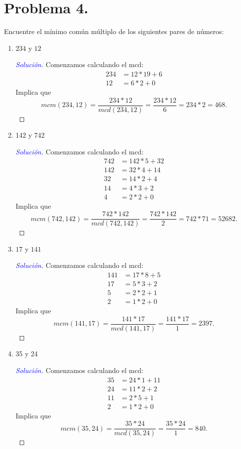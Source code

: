 \documentclass[a4paper,12pt]{article}
\newenvironment{solution}
  {\renewcommand\qedsymbol{$\square$}\begin{proof}[\textcolor{blue}{Solución}]}
  {\end{proof}}
\begin{document}
\section{Problema 4.} Encuentre el mínimo común múltiplo de los siguientes pares de números:
\begin{enumerate}[label=\alph*.]
	\item $234$ y $12$
	\begin{solution}
		Comenzamos calculando el mcd:
		\begin{align*}
			 234 &= 12*19 + 6\\
			12    &= 6*2 + 0
		\end{align*}
	Implica que 
	$$mcm(234,12)=\frac{234*12}{mcd(234,12)}=\frac{234*12}{6}=234*2=468.$$
	\end{solution}
	\item 142 y 742
	\begin{solution}
			Comenzamos calculando el mcd:
		\begin{align*}
			 742 &= 142*5 + 32\\
			142 &= 32*4 + 14\\
			32 &= 14*2 + 4\\
			14 &= 4*3 + 2\\
			4 &= 2*2 + 0
		\end{align*}
	Implica que
	$$mcm(742,142)=\frac{742*142}{mcd(742,142)}=\frac{742*142}{2}=742*71=52682.$$
	\end{solution}
	\item $17 $ y $141$
	\begin{solution}
			Comenzamos calculando el mcd:
		\begin{align*}
			 141 &= 17*8 + 5\\
			17 &= 5*3 + 2\\
			5 &= 2*2 + 1\\
			2 &= 1*2 + 0
		\end{align*}
	Implica que
	$$mcm(141,17)=\frac{141*17}{mcd(141,17)}=\frac{141*17}{1}=2397.$$
	\end{solution}
	\item 35 y 24
	\begin{solution}
			Comenzamos calculando el mcd:
		\begin{align*}
			 35 &= 24*1 + 11\\
			24 &= 11*2 + 2\\
			11 &= 2*5 + 1\\
			2 &= 1*2 + 0
		\end{align*}
	Implica que
	$$mcm(35,24)=\frac{35*24}{mcd(35,24)}=\frac{35*24}{1}=840.$$
	\end{solution}
\end{enumerate}
\end{document}
